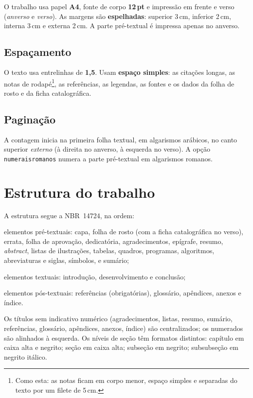 \documentclass[dsc]{coppe}
\begin{document}
  O trabalho usa papel \textbf{A4}, fonte de corpo \textbf{12\,pt} e impressão em
  frente e verso (\emph{anverso} e \emph{verso}). As margens são
  \textbf{espelhadas}: superior 3\,cm, inferior 2\,cm, interna 3\,cm e externa
  2\,cm. A parte pré-textual é impressa apenas no anverso.

  \section{Espaçamento}

  O texto usa entrelinhas de \textbf{1,5}. Usam \textbf{espaço simples}: as
  citações longas, as notas de rodapé\footnote{Como esta: as notas ficam em corpo
  menor, espaço simples e separadas do texto por um filete de 5\,cm.}, as
  referências, as legendas, as fontes e os dados da folha de rosto e da ficha
  catalográfica.

  \section{Paginação}

  A contagem inicia na primeira folha textual, em algarismos arábicos, no canto
  superior \emph{externo} (à direita no anverso, à esquerda no verso). A opção
  \verb|numeraisromanos| numera a parte pré-textual em algarismos romanos.

  \chapter{Estrutura do trabalho}

  A estrutura segue a \mbox{NBR~14724}, na ordem:

  \begin{alineas}
    \item elementos pré-textuais: capa, folha de rosto (com a ficha catalográfica
      no verso), errata, folha de aprovação, dedicatória, agradecimentos,
      epígrafe, resumo, \emph{abstract}, listas de ilustrações, tabelas, quadros,
      programas, algoritmos, abreviaturas e siglas, símbolos, e sumário;
    \item elementos textuais: introdução, desenvolvimento e conclusão;
    \item elementos pós-textuais: referências (obrigatórias), glossário,
      apêndices, anexos e índice.
  \end{alineas}

  Os títulos sem indicativo numérico (agradecimentos, listas, resumo, sumário,
  referências, glossário, apêndices, anexos, índice) são centralizados; os
  numerados são alinhados à esquerda. Os níveis de seção têm formatos distintos:
  capítulo em caixa alta e negrito; seção em caixa alta; subseção em negrito;
  subsubseção em negrito itálico.
\end{document}
